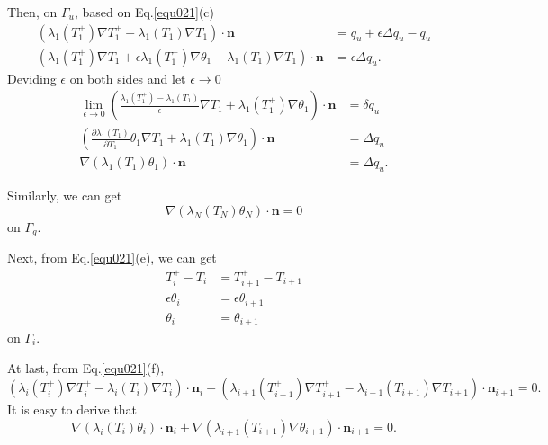 \documentclass[UTF-8]{article}
\begin{document}
Then, on $\Gamma_u$, based on Eq.\ref{equ021}(c)
\begin{align*}
	\left( \lambda_1(T_1^+) \nabla T_1^+ - \lambda_1(T_1) \nabla T_1 \right) \cdot \pmb{n} &= q_u + \epsilon \Delta q_u - q_u \\
	\left( \lambda_1(T_1^+) \nabla T_1 + \epsilon \lambda_1(T_1^+) \nabla \theta_1 - \lambda_1(T_1) \nabla T_1 \right) \cdot \pmb{n} &= \epsilon \Delta q_u.
\end{align*}
Deviding $\epsilon$ on both sides and let $\epsilon \to 0$
\begin{align}\label{equ026}
	\lim_{\epsilon \to 0} \left( \frac{\lambda_1(T_1^+) - \lambda_1(T_1)}{\epsilon} \nabla T_1 + \lambda_1(T_1^+) \nabla \theta_1 \right) \cdot \pmb{n} &= \delta q_u \nonumber \\
	\left( \frac{\partial \lambda_1(T_1)}{\partial T_1}\theta_1 \nabla T_1 + \lambda_1(T_1) \nabla \theta_1 \right) \cdot\pmb{n}&= \Delta q_u \nonumber \\
	\nabla \left( \lambda_1(T_1)\theta_1 \right) \cdot \pmb{n} &= \Delta q_u.
\end{align}

Similarly, we can get
\begin{equation}\label{equ027}
	\nabla \left( \lambda_N(T_N)\theta_N \right) \cdot \pmb{n} = 0
\end{equation}
on $\Gamma_g$.

Next, from Eq.\ref{equ021}(e), we can get
\begin{align}\label{equ028}
	T_i^+ - T_i &= T_{i+1}^+ - T_{i+1} \nonumber \\
	\epsilon \theta_i &= \epsilon \theta_{i+1} \nonumber\\
	\theta_i &= \theta_{i+1}
\end{align}
on $\Gamma_i$.

At last, from Eq.\ref{equ021}(f),
\begin{equation*}
	\left( \lambda_i(T_i^+)\nabla T_i^+ - \lambda_i(T_i)\nabla T_i \right) \cdot \pmb{n}_i+ \left( \lambda_{i+1}(T_{i+1}^+)\nabla T_{i+1}^+ - \lambda_{i+1}(T_{i+1})\nabla T_{i+1} \right) \cdot \pmb{n}_{i+1} = 0.
\end{equation*}
It is easy to derive that
\begin{equation}\label{equ029}
	\nabla(\lambda_i(T_i)\theta_i) \cdot \pmb{n}_i + \nabla(\lambda_{i+1}(T_{i+1})\nabla\theta_{i+1}) \cdot \pmb{n}_{i+1} = 0.
\end{equation}
\end{document}
